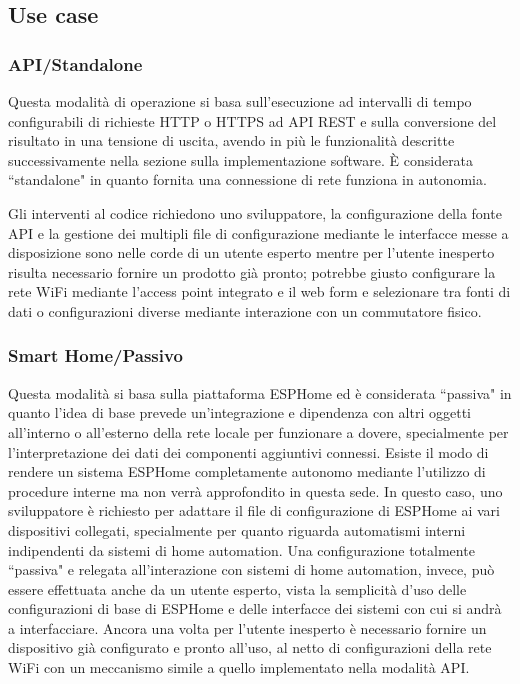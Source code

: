 \documentclass[12pt,a4paper]{report}
\begin{document}
\subsection{Use case}

\subsubsection{API/Standalone}
Questa modalità di operazione si basa sull'esecuzione ad intervalli di tempo configurabili di richieste HTTP o HTTPS ad API REST
e sulla conversione del risultato in una tensione di uscita, avendo in più le funzionalità descritte successivamente nella sezione
sulla implementazione software.
È considerata ``standalone" in quanto fornita una connessione di rete funziona in autonomia.

Gli interventi al codice richiedono uno sviluppatore, la configurazione della fonte API e la gestione dei multipli file di configurazione
mediante le interfacce messe a disposizione sono nelle corde di un utente esperto mentre per l'utente inesperto risulta necessario
fornire un prodotto già pronto; potrebbe giusto configurare la rete WiFi mediante l'access point integrato e il web form e
selezionare tra fonti di dati o configurazioni diverse mediante interazione con un commutatore fisico.

\subsubsection{Smart Home/Passivo}
Questa modalità si basa sulla piattaforma ESPHome ed è considerata ``passiva" in quanto l'idea di base prevede un'integrazione
e dipendenza con altri oggetti all'interno o all'esterno della rete locale per funzionare a dovere, specialmente per l'interpretazione
dei dati dei componenti aggiuntivi connessi.
Esiste il modo di rendere un sistema ESPHome completamente autonomo mediante l'utilizzo di procedure interne ma non verrà
approfondito in questa sede.
In questo caso, uno sviluppatore è richiesto per adattare il file di configurazione di ESPHome ai vari dispositivi collegati,
specialmente per quanto riguarda automatismi interni indipendenti da sistemi di home automation.
Una configurazione totalmente ``passiva" e relegata all'interazione con sistemi di home automation, invece, può essere effettuata
anche da un utente esperto, vista la semplicità d'uso delle configurazioni di base di ESPHome e delle interfacce dei sistemi con cui
si andrà a interfacciare.
Ancora una volta per l'utente inesperto è necessario fornire un dispositivo già configurato e pronto all'uso, al netto di
configurazioni della rete WiFi con un meccanismo simile a quello implementato nella modalità API.
\end{document}
